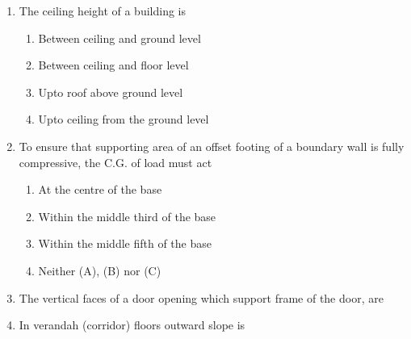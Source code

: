 \documentclass[11pt,a4paper]{article}
\begin{document}
\begin{enumerate}
\\
\item{The ceiling height of a building is}
\begin{enumerate}[label=\Alph*.]
\item{Between ceiling and ground level}
\item{Between ceiling and floor level}
\item{Upto roof above ground level}
\item{Upto ceiling from the ground level}
\end{enumerate}
\item{To ensure that supporting area of an offset footing of a boundary wall is fully compressive, the C.G. of load must act}
\begin{enumerate}[label=\Alph*.]
\item{At the centre of the base}
\item{Within the middle third of the base}
\item{Within the middle fifth of the base}
\item{Neither (A), (B) nor (C)}
\end{enumerate}
\item{The vertical faces of a door opening which support frame of the door, are}
\\
\item{In verandah (corridor) floors outward slope is}
\\

\end{enumerate}
\end{document}
